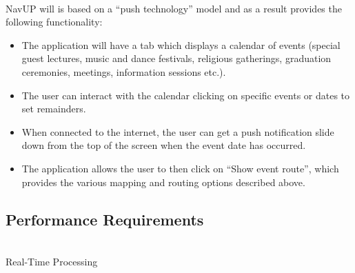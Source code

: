 \documentclass[runningheads,a4paper]{llncs}
\begin{document}
\let\labelitemi\labelitemii

\noindent \\ NavUP will is based on a “push technology” model and as a result provides the following functionality:

\begin{itemize}

\item The application will have a tab which displays a calendar of events (special guest lectures, music and dance festivals, religious gatherings, graduation ceremonies, meetings, information sessions etc.).
\item The user can interact with the calendar clicking on specific events or dates to set remainders.
\item When connected to the internet, the user can get a push notification slide down from the top of the screen when the event date has occurred.
\item The application allows the user to then click on “Show event route”, which provides the various mapping and routing options described above.

\end{itemize}

\subsection{Performance Requirements}

\let\labelitemi\labelitemii

\noindent \\ Real-Time Processing
\end{document}
